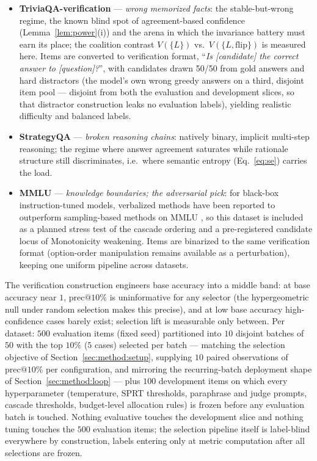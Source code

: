 \documentclass[11pt]{article}
\makeatletter
\newcommand{\precat}[1]{\mathrm{prec}@#1}
\makeatother
\begin{document}
\begin{itemize}[leftmargin=1.6em, itemsep=2pt]
\item \textbf{TriviaQA-verification} \citep{joshi2017} ---
  \emph{wrong memorized facts}: the stable-but-wrong regime, the known
  blind spot of agreement-based confidence
  (Lemma~\ref{lem:power}(i)) and the arena in which the invariance
  battery must earn its place; the coalition contrast $V(\{L\})$ vs.\
  $V(\{L,\mathrm{flip}\})$ is measured here. Items are converted to
  verification format, ``\emph{Is [candidate] the correct answer to
  [question]?}'', with candidates drawn 50/50 from gold answers and
  hard distractors (the model's own wrong greedy answers on a third,
  disjoint item pool --- disjoint from both the evaluation and
  development slices, so that distractor construction leaks no
  evaluation labels), yielding realistic difficulty and balanced
  labels.
\item \textbf{StrategyQA} \citep{geva2021} --- \emph{broken reasoning
  chains}: natively binary, implicit multi-step reasoning; the regime
  where answer agreement saturates while rationale structure still
  discriminates, i.e.\ where semantic entropy (Eq.~\eqref{eq:se})
  carries the load.
\item \textbf{MMLU} \citep{hendrycks2021} --- \emph{knowledge
  boundaries; the adversarial pick}: for black-box instruction-tuned
  models, verbalized methods have been reported to outperform
  sampling-based methods on MMLU \citep{vashurin2025}, so this dataset
  is included as a planned stress test of the cascade ordering and a
  pre-registered candidate locus of Monotonicity weakening. Items are
  binarized to the same verification format (option-order manipulation
  remains available as a perturbation), keeping one uniform pipeline
  across datasets.
\end{itemize}

The verification construction engineers base accuracy into a middle
band: at base accuracy near $1$, $\precat{10\%}$ is uninformative for
any selector (the hypergeometric null under random selection makes
this precise), and at low base accuracy high-confidence cases barely
exist; selection lift is measurable only between. Per dataset:
$500$ evaluation items (fixed seed) partitioned into $10$ disjoint
batches of $50$ with the top $10\%$ ($5$ cases) selected per batch --- matching the
selection objective of Section~\ref{sec:method:setup}, supplying $10$
paired observations of $\precat{10\%}$ per configuration, and mirroring
the recurring-batch deployment shape of
Section~\ref{sec:method:loop} --- plus $100$ development items on
which every hyperparameter (temperature, SPRT thresholds, paraphrase
and judge prompts, cascade thresholds, budget-level allocation rules)
is frozen before any evaluation batch is touched. Nothing evaluative
touches the development slice and nothing tuning touches the $500$
evaluation items; the selection pipeline itself is label-blind
everywhere by construction, labels entering only at metric
computation after all selections are frozen.
\end{document}
